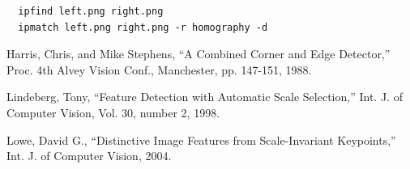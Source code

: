 \begin{verbatim}
  ipfind left.png right.png
  ipmatch left.png right.png -r homography -d
\end{verbatim}

\begin{thebibliography}{1}

 Harris, Chris, and Mike Stephens, ``A Combined
  Corner and Edge Detector,'' Proc. 4th Alvey Vision Conf., Manchester,
  pp. 147-151, 1988.

 Lindeberg, Tony, ``Feature Detection with Automatic
  Scale Selection,''  Int. J. of Computer Vision, Vol. 30, number 2,
  1998.

 Lowe, David G., ``Distinctive Image Features from
  Scale-Invariant Keypoints,'' Int. J. of Computer Vision, 2004.

\end{thebibliography}
